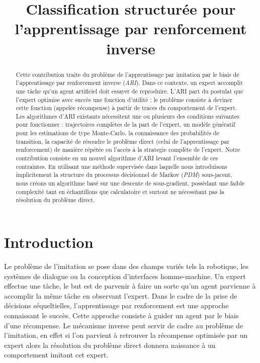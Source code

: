\documentclass[publibook-draft]{CAp2012}
\title{Classification structurée pour l'apprentissage par renforcement inverse}
\author{\fontsize{12}{12}\selectfont{Edouard Klein\inst{1}$^,$\inst{2}, Bilal Piot \inst{1}$^,$\inst{3}, Matthieu Geist\inst{1}, Olivier Pietquin\inst{1}$^,$\inst{3}}}
\institute{
Sup\'elec, IMS Research group, France, \texttt{prenom.nom@supelec.fr}
\and
Equipe ABC,
LORIA, France
\and
UMI 2958
GeorgiaTech-CNRS, France
}
\begin{document}
\maketitle


\begin{abstract}
  Cette contribution traite du problème de l'apprentissage par imitation par le biais de l'apprentissage par renforcement inverse (\emph{ARI}). Dans ce contexte, un expert accomplit une tâche qu'un agent artificiel doit essayer de reproduire. L'ARI part du postulat que l'expert optimise avec succès une fonction d'utilité ; le problème consiste à deviner cette fonction (appelée récompense) à partir de  traces du comportement de l'expert. Les algorithmes d'ARI existants nécessitent une ou plusieurs des conditions suivantes pour fonctionner : trajectoires complètes de la part de l'expert, un modèle génératif pour les estimations de type Monte-Carlo, la connaissance des probabilités de transition, la capacité de résoudre le problème direct (celui de l'apprentissage par renforcement) de manière répétée ou l'accès à la strategie complète de l'expert. Notre contribution consiste en un nouvel algorithme d'ARI levant l'ensemble de ces contraintes. En utilisant une méthode supervisée dans laquelle nous introduisons implicitement la structure du processus décisionnel de Markov ({\it PDM}) sous-jacent, nous créons un algorithme basé sur une descente de sous-gradient, possèdant une faible complexité tant en échantillons que calculatoire et surtout ne nécessitant pas la résolution du problème direct.
\end{abstract}
\section{Introduction}
Le problème de l'imitation se pose dans des champs variés tels la robotique, les systèmes de dialogue ou la conception d'interfaces homme-machine. Un expert effectue une tâche, le but est de parvenir à faire un sorte qu'un agent parvienne à accomplir la même tâche en observant l'expert. Dans le cadre de la prise de décisions séqueltielles, l'apprentissage par renforcement est une approche connaissant le succès. Cette approche consiste à guider un agent par le biais d'une récompense. Le mécanisme inverse peut servir de cadre au problème de l'imitation, en effet si l'on parvient à retrouver la récompense optimisée par un expert alors la résolution du problème direct donnera naissance à un comportement imitant cet expert.\\
\end{document}
